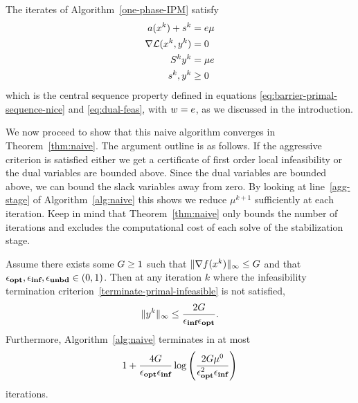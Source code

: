 \documentclass{article}
\begin{document}
The iterates of Algorithm~\ref{one-phase-IPM} satisfy
\begin{subequations}
\begin{flalign}
a(x^{k}) + s^{k} &= e \mu \\
\nabla \mathcal{L}(x^{k}, y^{k}) &= 0 \\
S^{k} y^{k} &= \mu e \\
s^{k}, y^{k} &\ge 0
\end{flalign}
\end{subequations}
which is the central sequence property defined in equations \eqref{eq:barrier-primal-sequence-nice} and \eqref{eq:dual-feas}, with $w = e$, as we discussed in the introduction.


We now proceed to show that this naive algorithm converges in Theorem~\ref{thm:naive}. The argument outline is as follows. If the aggressive criterion is satisfied either we get a certificate of first order local infeasibility or the dual variables are bounded above. Since the dual variables are bounded above, we can bound the slack variables away from zero. By looking at line~\ref{agg-stage} of Algorithm~\ref{alg:naive} this shows we reduce $\mu^{k+1}$ sufficiently at each iteration. Keep in mind that Theorem~\ref{thm:naive} only bounds the number of iterations and excludes the computational cost of each solve of the stabilization stage.

\begin{theorem}\label{thm:naive}
Assume there exists some $G \ge 1$ such that $\| \nabla f(x^k) \|_{\infty} \le G$ and that $\epsilon_{\textbf{opt}}, \epsilon_{\textbf{inf}}, \epsilon_{\textbf{unbd}} \in (0, 1)$. Then at any iteration $k$ where the infeasibility termination criterion~\eqref{terminate-primal-infeasible} is not satisfied,
$$
\| y^{k} \|_{\infty} \le \frac{2 G}{ \epsilon_{\textbf{inf}} \epsilon_{\textbf{opt}}}.
$$
Furthermore, Algorithm~\ref{alg:naive} terminates in at most 
$$
1 + \frac{4 G}{\epsilon_{\textbf{opt}} \epsilon_{\textbf{inf}} } \log\left( \frac{2 G \mu^{0}}{\epsilon_{\textbf{opt}}^2 \epsilon_{\textbf{inf}} } \right)
$$
iterations.
\end{theorem}
\end{document}
